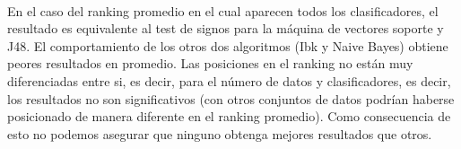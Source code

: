 \documentclass[10pt, a4paper,spanish]{article}
\begin{document}
		\paragraph{}
		En el caso del ranking promedio en el cual aparecen todos los clasificadores, el resultado es equivalente al test de signos para la máquina de vectores soporte y J48. El comportamiento de los otros dos algoritmos (Ibk y Naive Bayes) obtiene peores resultados en promedio. Las posiciones en el ranking no están muy diferenciadas entre si, es decir, para el número de datos y clasificadores, es decir, los resultados no son significativos (con otros conjuntos de datos podrían haberse posicionado de manera diferente en el ranking promedio). Como consecuencia de esto no podemos asegurar que ninguno obtenga mejores resultados que otros.
\end{document}
